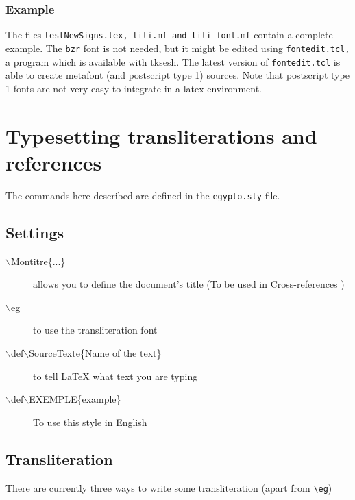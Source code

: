 \documentclass[final]{article}
\def\Backslash{$\backslash$}
\begin{document}
\subsubsection{Example}

The files \texttt{testNewSigns.tex, titi.mf and titi\_font.mf} contain
a complete example. The \texttt{bzr} font is not needed, but it might
be edited using \texttt{fontedit.tcl,} a program which is available
with tksesh. The latest version of \texttt{fontedit.tcl} is able to
create metafont (and postscript type 1) sources. Note that postscript
type 1 fonts are not very easy to integrate in a latex environment.

\section{Typesetting transliterations and references}
The commands here described are defined in the \verb=egypto.sty= file.

\subsection{Settings}

\begin{description}
  \item[\Backslash Montitre\{...\}] allows you to define the document's title 
 (To be used in Cross-references )

 \item[\Backslash eg] to use the transliteration font

 \item[\Backslash def\Backslash SourceTexte\{Name of the text\}] to tell LaTeX what
text you are  typing

\item[\Backslash def\Backslash EXEMPLE\{example\}] To use this style in English

\end{description}

\subsection{Transliteration}

 There are currently three ways to write some transliteration
 (apart from \verb/\eg/)
\end{document}
